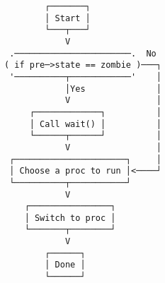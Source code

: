 \documentclass[varwidth,crop]{standalone}
\begin{document}
\begin{verbatim}
        ┌───────┐
        │ Start │
        └───┬───┘
            V
 .───────────────────────.  No
( if pre─>state == zombie )───┐
 '──────────┬────────────'    │
            │Yes              │
            V                 │
     ┌─────────────┐          │
     │ Call wait() │          │
     └──────┬──────┘          │
            V                 │
 ┌──────────────────────┐     │
 │ Choose a proc to run │<────┘
 └──────────┬───────────┘
            V
    ┌────────────────┐
    │ Switch to proc │
    └───────┬────────┘
            V
        ┌──────┐
        │ Done │
        └──────┘
\end{verbatim}
\end{document}
